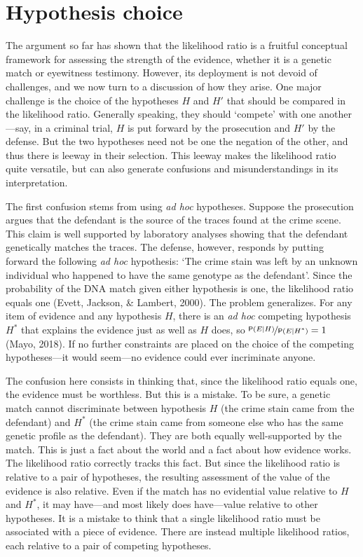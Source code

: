 \documentclass[
  10pt,
  dvipsnames,enabledeprecatedfontcommands]{scrartcl}
\newcommand{\pr}[1]{\mathsf{P}(#1)}
\begin{document}
\hypertarget{hypothesis-choice}{%
\section{\texorpdfstring{Hypothesis choice
\label{sec:hchoice}}{Hypothesis choice }}\label{hypothesis-choice}}

The argument so far has shown that the likelihood ratio is a fruitful
conceptual framework for assessing the strength of the evidence, whether
it is a genetic match or eyewitness testimony. However, its deployment
is not devoid of challenges, and we now turn to a discussion of how they
arise. One major challenge is the choice of the hypotheses \(H\) and
\(H'\) that should be compared in the likelihood ratio. Generally
speaking, they should `compete' with one another---say, in a criminal
trial, \(H\) is put forward by the prosecution and \(H'\) by the
defense. But the two hypotheses need not be one the negation of the
other, and thus there is leeway in their selection. This leeway makes
the likelihood ratio quite versatile, but can also generate confusions
and misunderstandings in its interpretation.

The first confusion stems from using \textit{ad hoc} hypotheses. Suppose
the prosecution argues that the defendant is the source of the traces
found at the crime scene. This claim is well supported by laboratory
analyses showing that the defendant genetically matches the traces. The
defense, however, responds by putting forward the following
\textit{ad hoc} hypothesis: `The crime stain was left by an unknown
individual who happened to have the same genotype as the defendant'.
Since the probability of the DNA match given either hypothesis is one,
the likelihood ratio equals one (Evett, Jackson, \& Lambert, 2000). The
problem generalizes. For any item of evidence and any hypothesis \(H\),
there is an \textit{ad hoc} competing hypothesis \(H^*\) that explains
the evidence just as well as \(H\) does, so
\(\nicefrac{\pr{E \vert H}}{\pr{E \vert H^*}}=1\) (Mayo, 2018). If no
further constraints are placed on the choice of the competing
hypotheses---it would seem---no evidence could ever incriminate anyone.

The confusion here consists in thinking that, since the likelihood ratio
equals one, the evidence must be worthless. But this is a mistake. To be
sure, a genetic match cannot discriminate between hypothesis \(H\) (the
crime stain came from the defendant) and \(H^*\) (the crime stain came
from someone else who has the same genetic profile as the defendant).
They are both equally well-supported by the match. This is just a fact
about the world and a fact about how evidence works. The likelihood
ratio correctly tracks this fact. But since the likelihood ratio is
relative to a pair of hypotheses, the resulting assessment of the value
of the evidence is also relative. Even if the match has no evidential
value relative to \(H\) and \(H^*\), it may have---and most likely does
have---value relative to other hypotheses. It is a mistake to think that
a single likelihood ratio must be associated with a piece of evidence.
There are instead multiple likelihood ratios, each relative to a pair of
competing hypotheses.
\end{document}
